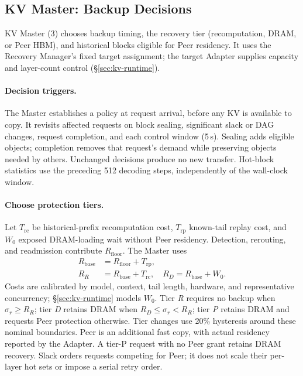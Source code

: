 \subsection{KV Master: Backup Decisions}
\label{sec:kv-placement}
\label{sec:kv-master}

KV Master (3) chooses backup timing, the recovery tier (recomputation,
DRAM, or Peer HBM), and historical blocks eligible for Peer residency.
It uses the Recovery Manager's fixed
target assignment; the target Adapter supplies capacity and layer-count
control (\S\ref{sec:kv-runtime}).

\paragraph{Decision triggers.}
The Master establishes a policy at request arrival, before any KV is
available to copy. It revisits affected requests on block sealing,
significant slack or DAG changes, request completion, and each control
window (5\,s). Sealing adds eligible objects; completion removes
that request's demand while preserving objects needed by others.
Unchanged decisions produce no new transfer. Hot-block statistics use
the preceding 512 decoding steps, independently of the wall-clock window.

\paragraph{Choose protection tiers.}
Let $T_{\mathrm{rc}}$ be historical-prefix recomputation cost,
$T_{\mathrm{rp}}$ known-tail replay cost, and $W_0$ exposed DRAM-loading
wait without Peer residency. Detection, rerouting, and readmission
contribute $R_{\mathrm{floor}}$. The Master uses
\begin{equation}
\begin{aligned}
 R_{\mathrm{base}}&=R_{\mathrm{floor}}+T_{\mathrm{rp}},\\
 R_R&=R_{\mathrm{base}}+T_{\mathrm{rc}},\quad
 R_D=R_{\mathrm{base}}+W_0.
\end{aligned}
\label{eq:recovery-base}
\end{equation}
Costs are calibrated by model, context, tail length, hardware, and
representative concurrency; \S\ref{sec:kv-runtime} models $W_0$.
Tier \emph{R} requires no backup when $\sigma_r\ge R_R$;
tier \emph{D} retains DRAM when $R_D\le\sigma_r<R_R$;
tier \emph{P} retains DRAM and requests Peer protection otherwise.
Tier changes use 20\% hysteresis around these nominal boundaries.
Peer is an additional fast copy, with actual residency reported by
the Adapter. A tier-P request with no Peer grant retains DRAM recovery.
Slack orders requests competing for Peer; it does not scale their
per-layer hot sets or impose a serial retry order.

